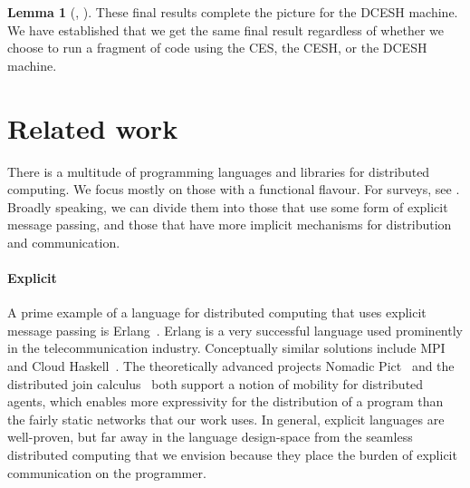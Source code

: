 \documentclass{article}
\theoremstyle{definition}
\newtheorem{lemma}[theorem]{Lemma}
\newcommand{\DCESHn}{DCESH}
\newcommand{\Conid}[1]{\mathit{#1}}
\newcommand{\Varid}[1]{\mathit{#1}}
\def\resethooks{\global\let\SaveRestoreHook\empty
  \global\let\ColumnHook\empty}
\newlength{\blanklineskip}
\renewcommand\Varid[1]{\mathord{\textsf{#1}}}
\let\Conid\Varid
\renewcommand\Varid[1]{\textsf{#1}}
\begin{document}
\begin{lemma}[{\textsmaller[.5]{\ensuremath{\Conid{HeapUpdate.env}}}}, {\textsmaller[.5]{\ensuremath{\Conid{HeapUpdate.stack}}}}]
\begin{comment}
\>[B]{}\Varid{initial-related}_{\Varid{Async}}\;\Varid{code}\;\Varid{root}\;\mathrel{=}\;\Varid{initial-related}_{\Varid{Sync}}\;\Varid{code}\;\Varid{root}{}\<[E]\\blanklineskip]\>[B]{}\Varid{bisimilarity}\;\mathbin{:}\;\Varid{∀}\;\Varid{code}\;\Varid{root}\;\Varid{→}\;(\Varid{code},[\mskip1.5mu \mskip1.5mu],[\mskip1.5mu \mskip1.5mu],\Varid{∅})\;\mathord{\sim}\;\Varid{initial-network}_{\Varid{Sync}}\;\Varid{code}\;\Varid{root}{}\<[E]\\
\>[B]{}\Varid{bisimilarity}\;\Varid{code}\;\Varid{root}\;\mathrel{=}\;\Varid{R}_{\Varid{Sync}},\Varid{bisimulation}_{\Varid{Sync}},\Varid{initial-related}_{\Varid{Sync}}\;\Varid{code}\;\Varid{root}{}\<[E]\ColumnHook
\end{hscode}\resethooks
\end{comment}

These final results complete the picture for the \DCESHn{} machine. We
have established that we get the same final result regardless of
whether we choose to run a fragment of code using the CES, the CESH,
or the \DCESHn{} machine.

\section{Related work}

There is a multitude of programming languages and libraries for distributed
computing. We focus mostly on those with a functional flavour. For surveys, see
\cite{DBLP:journals/jfp/TrinderLP02, DBLP:journals/lisp/LoidlRSHHKLMPPPT03}.
Broadly speaking, we can divide them into those that use some form of explicit
message passing, and those that have more implicit mechanisms for distribution
and communication.

\paragraph*{Explicit}
A prime example of a language for distributed computing that uses explicit
message passing is Erlang~\cite{DBLP:books/daglib/0073501}. Erlang is a very
successful language used prominently in the telecommunication industry.
Conceptually similar solutions include MPI~\cite{gropp1999using} and Cloud
Haskell~\cite{DBLP:conf/haskell/EpsteinBJ11}.
The theoretically advanced projects Nomadic
Pict~\cite{DBLP:journals/ieeecc/WojciechowskiS00} and the distributed join
calculus~\cite{DBLP:conf/concur/FournetGLMR96} both support a notion of
mobility for distributed agents, which enables more expressivity for the
distribution of a program than the fairly static networks that our work uses.
In general, explicit languages are well-proven, but far away in the language
design-space from the seamless distributed computing that we envision because
they place the burden of explicit communication on the programmer.



\end{lemma}
\end{document}
